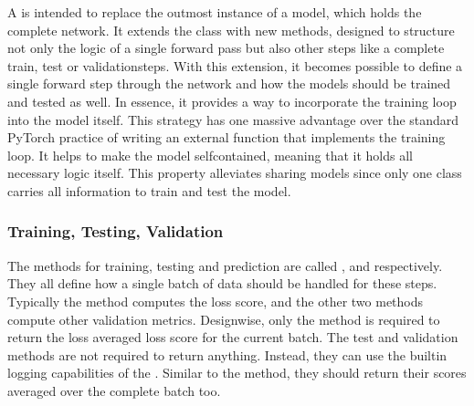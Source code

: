 \documentclass[letterpaper,10pt,english]{jupyterBook}
\begin{document}
\sphinxAtStartPar
A  is intended to replace the outmost  instance of a model, which holds the complete network.
It extends the  class with new methods, designed to structure not only the logic of a single forward pass but also other steps like a complete train\sphinxhyphen{}, test\sphinxhyphen{} or validation\sphinxhyphen{}steps.
With this extension, it becomes possible to define a single forward step through the network and how the models should be trained and tested as well.
In essence, it provides a way to incorporate the training loop into the model itself.
This strategy has one massive advantage over the standard PyTorch practice of writing an external function that implements the training loop.
It helps to make the model self\sphinxhyphen{}contained, meaning that it holds all necessary logic itself. This property alleviates sharing models since only one class carries all information to train and test the model.


\subsubsection{Training, Testing, Validation}
\label{\detokenize{PyTorchLightning:training-testing-validation}}
\sphinxAtStartPar
The methods for training, testing and prediction are called ,   and  respectively.
They all define how a single batch of data should be handled for these steps.
Typically the \sphinxhyphen{}method computes the loss score, and the other two methods compute other validation metrics.
Design\sphinxhyphen{}wise, only the \sphinxhyphen{}method is required to return the loss averaged loss score for the current batch.
The test\sphinxhyphen{} and validation methods are not required to return anything. Instead, they can use the built\sphinxhyphen{}in logging capabilities of the .
Similar to the \sphinxhyphen{}method, they should return their scores averaged over the complete batch too.
\end{document}
